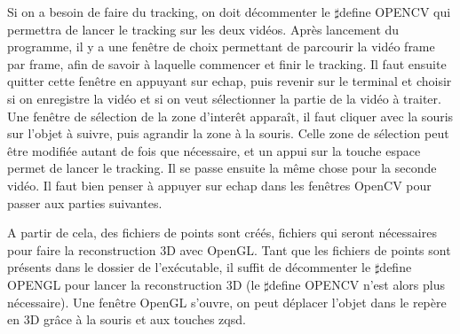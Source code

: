 Si on a besoin de faire du tracking, on doit décommenter le $\sharp$define OPENCV qui permettra de lancer le tracking sur les deux vidéos. Après lancement du programme, il y a une fenêtre de choix permettant de parcourir la vidéo frame par frame, afin de savoir à laquelle commencer et finir le tracking. Il faut ensuite quitter cette fenêtre en appuyant sur echap, puis revenir sur le terminal et choisir si on enregistre la vidéo et si on veut sélectionner la partie de la vidéo à traiter. Une fenêtre de sélection de la zone d'interêt apparaît, il faut cliquer avec la souris sur l'objet à suivre, puis agrandir la zone à la souris. Celle zone de sélection peut être modifiée autant de fois que nécessaire, et un appui sur la touche espace permet de lancer le tracking.
Il se passe ensuite la même chose pour la seconde vidéo. Il faut bien penser à appuyer sur echap dans les fenêtres OpenCV pour passer aux parties suivantes.

A partir de cela, des fichiers de points sont créés, fichiers qui seront nécessaires pour faire la reconstruction 3D avec OpenGL. Tant que les fichiers de points sont présents dans le dossier de l'exécutable, il suffit de décommenter le $\sharp$define OPENGL pour lancer la reconstruction 3D (le $\sharp$define OPENCV n'est alors plus nécessaire). Une fenêtre OpenGL s'ouvre, on peut déplacer l'objet dans le repère en 3D grâce à la souris et aux touches zqsd.